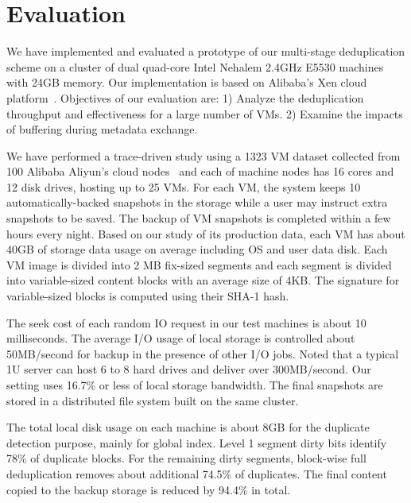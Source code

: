 
\section{Evaluation}
\label{sect:exper}

We have implemented and evaluated a prototype of our multi-stage deduplication scheme on a cluster
of dual quad-core Intel Nehalem 2.4GHz E5530 machines with 24GB memory.  
Our implementation is based on Alibaba's Xen cloud platform~\cite{Aliyun,WeiZhangIEEE}.
Objectives of our evaluation are:
1) Analyze the deduplication throughput and effectiveness for a large number of VMs.
2) Examine the impacts of buffering during metadata exchange.


We have performed a trace-driven study using  a 1323 VM dataset  collected from 100 
Alibaba Aliyun's cloud nodes~\cite{WeiZhangIEEE} and each
of machine nodes has 16 cores and 12 disk drives,  hosting  up to 25 VMs. 
For each VM, the system keeps 10 automatically-backed snapshots in the storage while
a user may instruct extra snapshots to be saved.
The backup of VM snapshots is completed within a few  hours every night.
Based on our study of its production  data,  each VM has about  40GB of storage  data usage on average
including OS and user data disk.
Each VM image is  divided into 2 MB fix-sized segments and each segment is divided into 
variable-sized content blocks  with an average size of 4KB.
The signature for variable-sized blocks is computed using their SHA-1 hash. 

The seek cost of each random IO request in our test machines is about  10 milliseconds.
The average I/O usage of local storage is controlled about 50MB/second for backup 
in the presence of other I/O jobs. Noted that a typical 1U server can host
6 to 8  hard drives and deliver over 300MB/second. Our setting uses 16.7\% or less 
of local storage bandwidth. 
The final snapshots are stored in a distributed file system built on the same 
cluster. 

The total local disk usage on each machine is about 8GB for the duplicate detection purpose,
mainly for global index. 
Level 1 segment dirty bits identify 78\% of duplicate blocks. For the remaining dirty segments,
block-wise full deduplication removes about additional 74.5\% of duplicates.
The final content copied to the backup storage is reduced by 94.4\% in total.

